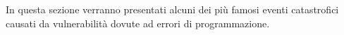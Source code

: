 In questa sezione verranno presentati alcuni dei più famosi eventi catastrofici causati da vulnerabilità dovute ad errori di programmazione.
